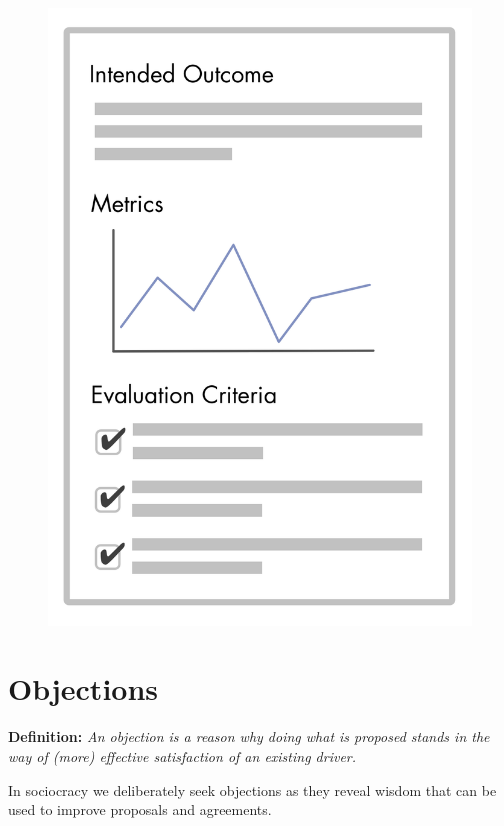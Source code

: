 \begin{figure}[htbp]
\centering
\includegraphics[keepaspectratio,width=\textwidth,height=0.75\textheight]{img/agreements/outcome-and-criteria.png}
\end{figure}

\section{Objections}
\label{objections}

\textbf{Definition:} \emph{An objection is a reason why doing what is proposed stands in the way of (more) effective satisfaction of an existing driver.}

In sociocracy we deliberately seek objections as they reveal
wisdom that can be used to improve proposals and agreements.

